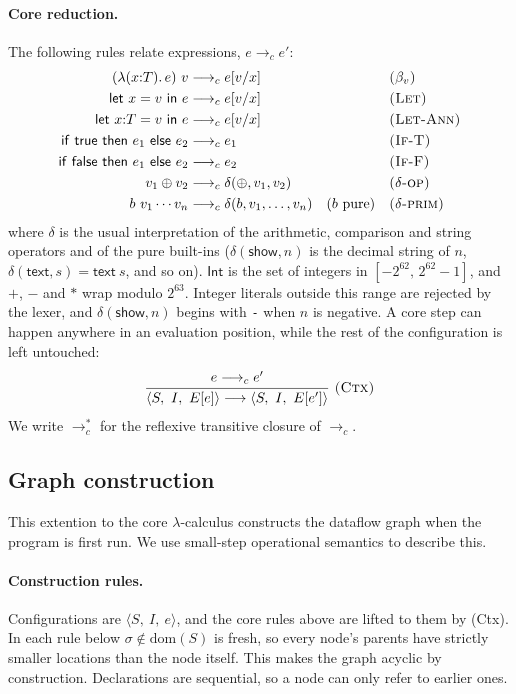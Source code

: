 \documentclass{article}
\makeatletter
\newcommand{\kw}[1]{\mathsf{#1}}
\newcommand{\cfg}[3]{\langle #1,\ #2,\ #3\rangle}
\newcommand{\step}{\longrightarrow}
\newcommand{\cstep}{\mathrel{\longrightarrow_{c}}}
\newcommand{\cstar}{\mathrel{\longrightarrow_{c}^{*}}}
\newcommand{\rul}[3]{\[\dfrac{\begin{array}{@{}c@{}}#2\end{array}}{\begin{array}{@{}c@{}}#3\end{array}}\ \textsc{#1}\]}
\makeatother
\begin{document}
\paragraph{Core reduction.} The following rules relate expressions, $e \cstep e'$:
\begin{align*}
(\lambda(x{:}T).\,e)\ v &\cstep e[v/x] & &\textsc{($\beta_v$)}\\
\kw{let}\ x = v\ \kw{in}\ e &\cstep e[v/x] & &\textsc{(Let)}\\
\kw{let}\ x{:}T = v\ \kw{in}\ e &\cstep e[v/x] & &\textsc{(Let-Ann)}\\
\kw{if}\ \kw{true}\ \kw{then}\ e_1\ \kw{else}\ e_2 &\cstep e_1 & &\textsc{(If-T)}\\
\kw{if}\ \kw{false}\ \kw{then}\ e_1\ \kw{else}\ e_2 &\cstep e_2 & &\textsc{(If-F)}\\
v_1 \oplus v_2 &\cstep \delta(\oplus, v_1, v_2) & &\textsc{($\delta$-op)}\\
b\ v_1\cdots v_n &\cstep \delta(b, v_1,\dots,v_n) \quad (b \text{ pure}) & &\textsc{($\delta$-prim)}
\end{align*}
where $\delta$ is the usual interpretation of the arithmetic, comparison and string operators and of the pure built-ins ($\delta(\kw{show},n)$ is the decimal string of $n$, $\delta(\kw{text},s) = \kw{text}\ s$, and so on). $\kw{Int}$ is the set of integers in $[-2^{62},\,2^{62}-1]$, and $+$, $-$ and $*$ wrap modulo $2^{63}$. Integer literals outside this range are rejected by the lexer, and $\delta(\kw{show},n)$ begins with \texttt{-} when $n$ is negative. A core step can happen anywhere in an evaluation position, while the rest of the configuration is left untouched:
\rul{(Ctx)}{e \cstep e'}{\cfg{S}{I}{E[e]} \step \cfg{S}{I}{E[e']}}
We write $\cstar$ for the reflexive transitive closure of $\cstep$.

\subsection{Graph construction}

This extention to the core $ \lambda $-calculus constructs the dataflow graph when the program is first run. We use small-step operational semantics to describe this.

\paragraph{Construction rules.}
Configurations are $\cfg{S}{I}{e}$, and the core rules above are lifted to them by (Ctx). In each rule below $\sigma \notin \mathrm{dom}(S)$ is fresh, so every node's parents have strictly smaller locations than the node itself. This makes the graph acyclic by construction. Declarations are sequential, so a node can only refer to earlier ones.
\end{document}

